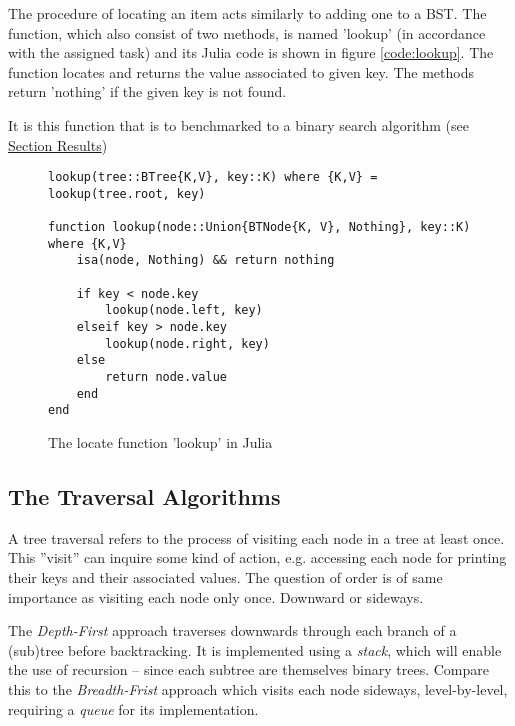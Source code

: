 \documentclass[a4paper, 11pt]{article}
\begin{document}
    The procedure of locating an item acts similarly to adding one to
    a BST. 
    The function, which also consist of two methods, is named 'lookup' (in
    accordance with the assigned task) and its Julia code is shown in figure
    \autoref{code:lookup}. The function locates and returns the value associated
    to given key. The methods return 'nothing' if the given key is not found. 
    
    It is this function that is to benchmarked to 
    a binary search algorithm (see \hyperref[sec:results]{Section Results})


    \begin{figure}[H]
        \centering
    \begin{verbatim}
lookup(tree::BTree{K,V}, key::K) where {K,V} = lookup(tree.root, key)

function lookup(node::Union{BTNode{K, V}, Nothing}, key::K) where {K,V}
    isa(node, Nothing) && return nothing

    if key < node.key
        lookup(node.left, key)
    elseif key > node.key
        lookup(node.right, key)
    else
        return node.value
    end
end
    \end{verbatim}
    \caption{The locate function 'lookup' in Julia}
    \label{code:lookup}
    \end{figure}

    \subsection*{The Traversal Algorithms}
    \label{sec:treetraversal}
    
    A tree traversal refers to the process of visiting each node in a tree at least once. This 
    ''visit'' can inquire some kind of action, e.g. accessing each node for printing their 
    keys and their associated values. The question of order is of same
    importance as visiting each node only once. Downward or sideways.

    The \emph{Depth-First} approach traverses downwards through each branch of a (sub)tree
    before backtracking. It is implemented using a \emph{stack}, which will enable 
    the use of recursion -- since each subtree are themselves binary trees. Compare
    this to the \emph{Breadth-Frist} approach which visits each node sideways,
    level-by-level, requiring a \emph{queue} for its implementation.
    
\end{document}
